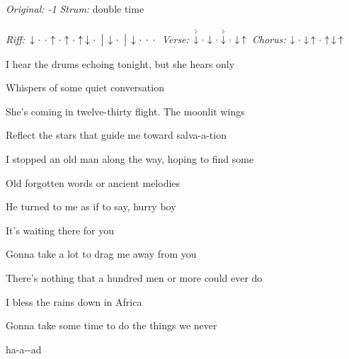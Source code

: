 \begin{song}


\begin{headerbox}
 \quad
\textit{Original: -1} \quad
\textit{Strum:} double time \par
\textit{Riff:} $\Down\Miss\Miss\Up\Miss\Up\Miss\Up\Down\Miss \Separator \Down\Miss \Separator \Down\Miss\Miss\Miss$ \quad
\textit{Verse:} $\AccentDown\Miss\Down\Miss\AccentDown\Miss\Down\Up$ \quad
\textit{Chorus:} $\Down\Miss\Down\Up\Miss\Up\Down\Up$
\end{headerbox}

\begin{hchordbox}
\end{hchordbox}

\large

\bigskip

\Intro {}    \par

\bigskip

 I hear the drums echoing tonight, but she hears only \par
{}Whispers of some quiet conversation  \par
{} She's coming in twelve-thirty flight. The moonlit wings \par
Reflect the stars that guide me toward salva-a-tion  \par
{} I stopped an old man along the way, hoping to find some \par
{}Old forgotten words or ancient melodies  \par
{} He turned to me as if to say, hurry boy \par
It's waiting there for you  \par

\bigskip

\begin{chorusboxwide}{\Chorus}
 Gonna take a lot to drag me away from you \par
{} There's nothing that a hundred men or more could ever do \par
{} I bless the rains down in Africa \par
{} Gonna take some time to do the things we never \par
{}ha-a--ad \par
{}   \par
{}   \par
\end{chorusboxwide}


\end{song}
